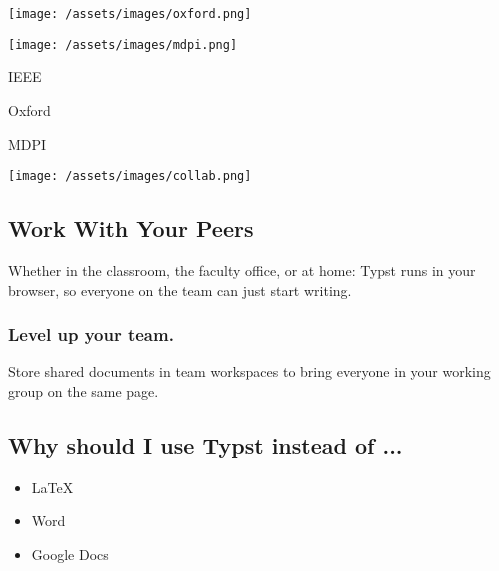 \texttt{[image: /assets/images/oxford.png]}

\texttt{[image: /assets/images/mdpi.png]}

\label{page-buttons}
{ IEEE }

{ Oxford }

{ MDPI }

\label{cloud-collaborative}
\texttt{[image: /assets/images/collab.png]}

\subsection{Work With Your Peers}\label{work-with-your-peers}

Whether in the classroom, the faculty office, or at home: Typst runs in
your browser, so everyone on the team can just start writing.

\subsubsection{Level up your team.}\label{level-up-your-team.}

Store shared documents in team workspaces to bring everyone in your
working group on the same page.

\label{why-use-typst}
\subsection{Why should I use Typst instead of
...}\label{why-should-i-use-typst-instead-of-...}

\begin{itemize}
\tightlist
\item
  LaTeX
\item
  Word
\item
  Google Docs
\end{itemize}


